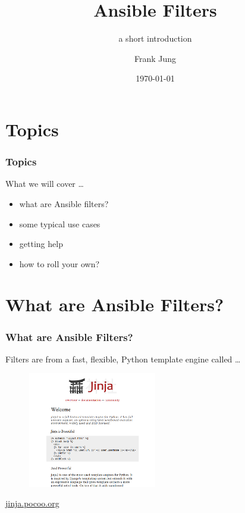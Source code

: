 \documentclass[pdf]{beamer}
\title{Ansible Filters}
\subtitle{a short introduction}
\author{Frank Jung}
\institute{frankhjung@linux.com}
\date{\today}
\begin{document}
\begin{frame}
  \titlepage{}
\end{frame}


\section{Topics}

\begin{frame}
  \frametitle{Topics}
  What we will cover \ldots
  \pause{}
  \begin{itemize}[<+-|alert@+>]
    \item what are Ansible filters?
    \item some typical use cases
    \item getting help
    \item how to roll your own?
  \end{itemize}
\end{frame}

\section{What are Ansible Filters?}

\begin{frame}
  \frametitle{What are Ansible Filters?}
  Filters are from a fast, flexible, Python template engine called \ldots
  \pause{}
  \begin{center}
    \begin{figure}
      \includegraphics[width=0.5\textwidth]{jinja.png}
    \end{figure}
    \href{http://jinja.pocoo.org}{jinja.pocoo.org}
  \end{center}
\end{frame}
\end{document}
